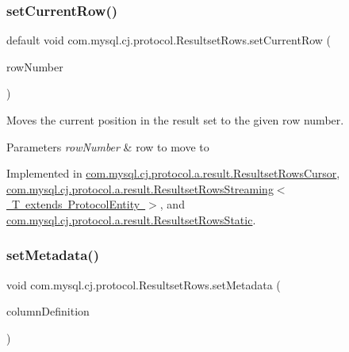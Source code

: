 \subsubsection{\texorpdfstring{set\+Current\+Row()}{setCurrentRow()}}
{\footnotesize\ttfamily default void com.\+mysql.\+cj.\+protocol.\+Resultset\+Rows.\+set\+Current\+Row (\begin{DoxyParamCaption}\item[{int}]{row\+Number }\end{DoxyParamCaption})}

Moves the current position in the result set to the given row number.


\begin{DoxyParams}{Parameters}
{\em row\+Number} & row to move to \\
\hline
\end{DoxyParams}


Implemented in \mbox{\hyperlink{classcom_1_1mysql_1_1cj_1_1protocol_1_1a_1_1result_1_1_resultset_rows_cursor_aab53d9374408ceaf15369f0b515ab56e}{com.\+mysql.\+cj.\+protocol.\+a.\+result.\+Resultset\+Rows\+Cursor}}, \mbox{\hyperlink{classcom_1_1mysql_1_1cj_1_1protocol_1_1a_1_1result_1_1_resultset_rows_streaming_ac2448082c41dad09ccd418eaf3f400e0}{com.\+mysql.\+cj.\+protocol.\+a.\+result.\+Resultset\+Rows\+Streaming$<$ T extends Protocol\+Entity $>$}}, and \mbox{\hyperlink{classcom_1_1mysql_1_1cj_1_1protocol_1_1a_1_1result_1_1_resultset_rows_static_a6975dcd56b2033fcfc7dbfe7a4fa83d8}{com.\+mysql.\+cj.\+protocol.\+a.\+result.\+Resultset\+Rows\+Static}}.

\mbox{\label{interfacecom_1_1mysql_1_1cj_1_1protocol_1_1_resultset_rows_a5121e355be1da17a4085068bb5611fb0}} 
\subsubsection{\texorpdfstring{set\+Metadata()}{setMetadata()}}
{\footnotesize\ttfamily void com.\+mysql.\+cj.\+protocol.\+Resultset\+Rows.\+set\+Metadata (\begin{DoxyParamCaption}\item[{\mbox{\hyperlink{interfacecom_1_1mysql_1_1cj_1_1protocol_1_1_column_definition}{Column\+Definition}}}]{column\+Definition }\end{DoxyParamCaption})}

